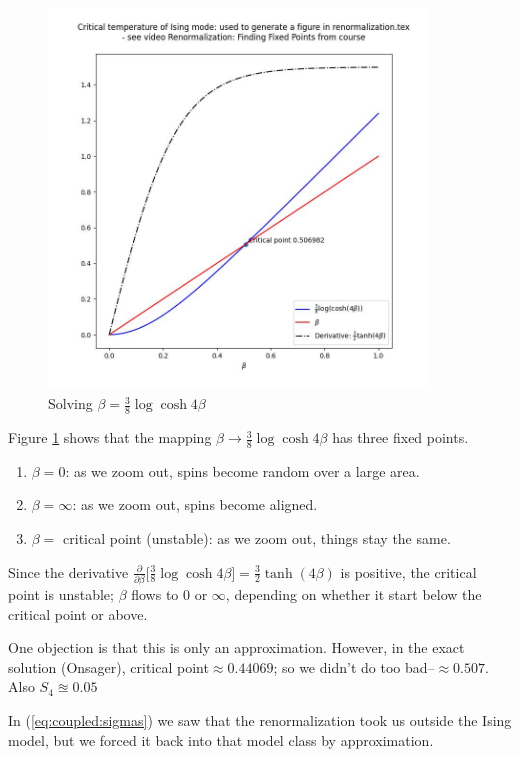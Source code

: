 \documentclass[]{article}
\begin{document}
\begin{figure}[H]
	\caption{Solving $\beta=\frac{3}{8} \log{\cosh{4\beta} }$}\label{fig:beta}
	\includegraphics[width=0.9\textwidth]{beta}
\end{figure}

Figure \ref{fig:beta} shows that the mapping $\beta\rightarrow\frac{3}{8} \log{\cosh{4\beta} }$ has three fixed points.
\begin{enumerate}
	\item $\beta=0$: as we zoom out, spins become random over a large area.
	\item  $\beta=\infty$: as we zoom out, spins become aligned.
	\item  $\beta=$ critical point (unstable): as we zoom out, things stay the same.
\end{enumerate}

Since the derivative  $\frac{\partial}{\partial \beta}\big[\frac{3}{8} \log{\cosh{4\beta}}\big]=\frac{3}{2} \tanh(4\beta)$ is positive, the critical point is unstable; $\beta$ flows to $0$ or $\infty$, depending on whether it start below the critical point or above.

One objection is that this is only an approximation. However, in the exact solution (Onsager), critical point$\approx0.44069$; so we didn't do too bad--$\approx0.507$. Also $S_4\approxeq0.05$

In (\ref{eq:coupled:sigmas}) we saw that the renormalization took us outside the Ising model, but we forced it back into that model class by approximation.
\end{document}
